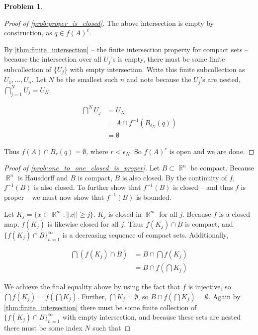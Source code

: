 \documentclass[english]{article}
\DeclareMathOperator{\R}{\mathbb{R}}
\newcommand{\inv}[1]{#1^{-1}}
\theoremstyle{definition}
\newtheorem{problem}[theorem]{Problem}
\begin{document}
\begin{problem}
\begin{proof}[Proof of \cref{prob:proper_is_closed}]
            The above intersection is empty by construction, as $q \in f(A)^c$.
            
            By \cref{thm:finite_intersection} -- the finite intersection property for compact sets -- because the intersection over all $U_j$'s is empty, there must be some finite subcollection of $\{U_j\}$ with empty intersection. Write this finite subcollection as $U_1, \dots, U_n$. Let $N$  be the smallest such $n$ and note because the $U_j$'s are nested, $\bigcap^N_{j=1} U_j = U_N$. 

            \begin{align*}
                \bigcap^N U_j
                & = U_N \\
                & = A \cap \inv{f}\left( \overline{B}_{\epsilon_N}(q) \right) \\
                & = \emptyset
            \end{align*}

            Thus $f(A) \cap B_{r}(q) = \emptyset$, where $r < \epsilon_N$. So $f(A)^c$ is open and we are done. 
    \end{proof}
    
    \begin{proof}[Proof of \cref{prob:one_to_one_closed_is_proper}]
        Let $B \subset \R^n$ be compact. Because $\R^n$ is Hausdorff and $B$ is compact, $B$ is also closed. By the continuity of $f$, $\inv{f}(B)$ is also closed. To further show that $\inv{f}(B)$ is closed -- and thus $f$ is proper -- we must now show that $\inv{f}(B)$ is bounded. 

        Let $K_j = \{x \in \R^m : ||x|| \geq j\}$. $K_j$ is closed in $\R^m$ for all $j$. Because $f$ is a closed map, $f(K_j)$ is likewise closed for all $j$. Thus $f(K_j) \cap B$ is compact, and $\{f(K_j) \cap B\}_{n = 1}^{\infty}$ is a decreasing sequence of compact sets. Additionally, 

        \begin{align*}
            \bigcap \left( f(K_j) \cap B \right)  
            & = B \cap \bigcap f(K_j) \\
            & = B \cap f\left( \bigcap K_j \right)
        \end{align*}

        We achieve the final equality above by using the fact that $f$ is injective, so $\bigcap f(K_j) = f\left( \bigcap K_j \right)$. Further, $\bigcap K_j = \emptyset$, so $B \cap f\left( \bigcap K_j \right) = \emptyset$. Again by \cref{thm:finite_intersection} there must be some finite collection of $\{f(K_j) \cap B\}_{n = 1}^{\infty}$ with empty intersection, and because these sets are nested there must be some index $N$ such that 


\end{proof}
\end{problem}
\end{document}
